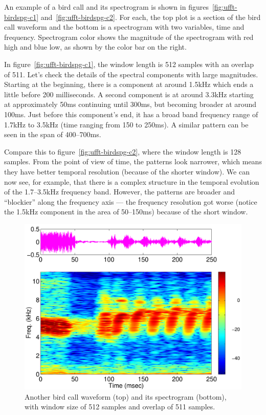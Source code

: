 An example of a bird call and its spectrogram is shown in
figures~\ref{fig:ufft-birdspg-c1} and~\ref{fig:ufft-birdspg-c2}. For
each, the top plot is a section of the bird call waveform and the
bottom is a spectrogram with two variables, time and
frequency. Spectrogram color shows the magnitude of the spectrogram
with red high and blue low, as shown by the color bar on the right.

In figure~\ref{fig:ufft-birdspg-c1}, the window length is 512 samples
with an overlap of 511. Let's check the details of the spectral
components with large magnitudes. Starting at the beginning, there is
a component at around 1.5kHz which ends a little before 200
milliseconds. A second component is at around 3.3kHz starting at
approximately 50ms continuing until 300ms, but becoming broader at
around 100ms. Just before this component's end, it has a broad band
frequency range of 1.7kHz to 3.5kHz (time ranging from 150 to
250ms). A similar pattern can be seen in the span of 400--700ms.

Compare this to figure~\ref{fig:ufft-birdspg-c2}, where the window
length is 128 samples. From the point of view of time, the patterns
look narrower, which means they have better temporal resolution
(because of the shorter window). We can now see, for example, that
there is a complex structure in the temporal evolution of the
1.7--3.5kHz frequency band. However, the patterns are broader and
``blockier'' along the frequency axis --- the frequency resolution got
worse (notice the 1.5kHz component in the area of 50--150ms) because
of the short window.

\begin{figure}[p]
\centerline{\includegraphics[height=0.4\textheight]{ch-fft/ufft_bluewing1am_spg512_511}}
\caption[Another bird call waveform and its spectrogram; 512 sample
window, overlap 511]{Another bird call waveform (top) and its
spectrogram (bottom), with window size of 512 samples and overlap of
511 samples.\label{fig:ufft-birdspg-b1}}
\end{figure}

